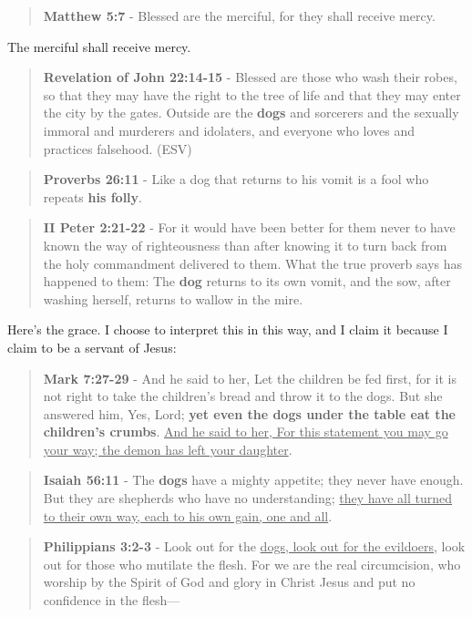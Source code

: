 \documentclass[11pt]{article}
\begin{document}
\begin{quote}
\textbf{Matthew 5:7} - Blessed are the merciful, for they shall receive mercy.
\end{quote}

The merciful shall receive mercy.

\begin{quote}
\textbf{Revelation of John 22:14-15} - Blessed are those who wash their robes, so that they may have the right to the tree of life and that they may enter the city by the gates. Outside are the \textbf{dogs} and sorcerers and the sexually immoral and murderers and idolaters, and everyone who loves and practices falsehood. (ESV)
\end{quote}

\begin{quote}
\textbf{Proverbs 26:11} - Like a dog that returns to his vomit is a fool who repeats \textbf{his folly}.
\end{quote}

\begin{quote}
\textbf{II Peter 2:21-22} - For it would have been better for them never to have known the way of righteousness than after knowing it to turn back from the holy commandment delivered to them. What the true proverb says has happened to them: The \textbf{dog} returns to its own vomit, and the sow, after washing herself, returns to wallow in the mire.
\end{quote}

Here's the grace. I choose to interpret this in this way, and I claim it because I claim to be a servant of Jesus:

\begin{quote}
\textbf{Mark 7:27-29} - And he said to her, Let the children be fed first, for it is not right to take the children's bread and throw it to the dogs. But she answered him, Yes, Lord; \textbf{yet even the dogs under the table eat the children's crumbs}. \uline{And he said to her, For this statement you may go your way; the demon has left your daughter}.
\end{quote}

\begin{quote}
\textbf{Isaiah 56:11} - The \textbf{dogs} have a mighty appetite; they never have enough. But they are shepherds who have no understanding; \uline{they have all turned to their own way, each to his own gain, one and all}.
\end{quote}

\begin{quote}
\textbf{Philippians 3:2-3} - Look out for the \uline{dogs, look out for the evildoers}, look out for those who mutilate the flesh. For we are the real circumcision, who worship by the Spirit of God and glory in Christ Jesus and put no confidence in the flesh—
\end{quote}
\end{document}

